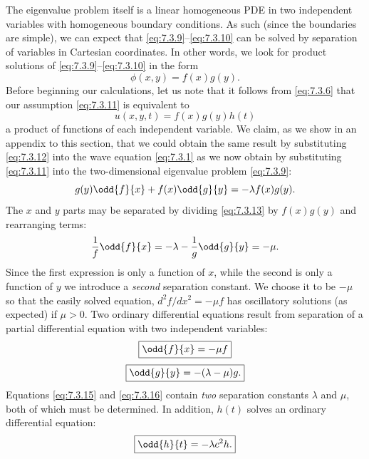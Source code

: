 The eigenvalue problem itself is a linear homogeneous PDE in two independent variables with homogeneous boundary conditions.  As such (since the boundaries are simple), we can expect that \eqref{eq:7.3.9}--\eqref{eq:7.3.10} can be solved by separation of variables in Cartesian coordinates.  In other words, we look for product solutions of \eqref{eq:7.3.9}--\eqref{eq:7.3.10} in the form
\begin{equation}
\phi(x,y) = f(x)g(y).
\label{eq:7.3.11}
\end{equation}
Before beginning our calculations, let us note that it follows from \eqref{eq:7.3.6} that our assumption \eqref{eq:7.3.11} is equivalent to
\begin{equation}
u(x,y,t) = f(x)g(y)h(t)
\label{eq:7.3.12}
\end{equation}
a product of functions of each independent variable.  We claim, as we show in an appendix to this section, that we could obtain the same result by substituting \eqref{eq:7.3.12} into the wave equation \eqref{eq:7.3.1} as we now obtain by substituting \eqref{eq:7.3.11} into the two-dimensional eigenvalue problem \eqref{eq:7.3.9}:
\begin{equation}
g(y)\odd{f}{x} + f(x)\odd{g}{y} = -\lambda f(x)g(y).
\label{eq:7.3.13}
\end{equation}
The $x$ and $y$ parts may be separated by dividing \eqref{eq:7.3.13} by $f(x)g(y)$ and rearranging terms:
\begin{equation}
\frac{1}{f}\odd{f}{x} = -\lambda - \frac{1}{g}\odd{g}{y} = -\mu.
\label{eq:7.3.14}
\end{equation}
Since the first expression is only a function of $x$, while the second is only a function of $y$ we introduce a \emph{second} separation constant.  We choose it to be $-\mu$ so that the easily solved equation, $d^2f/dx^2 = -\mu f$ has oscillatory solutions (as expected) if $\mu > 0$.  Two ordinary differential equations result from separation of a partial differential equation with two independent variables:
\begin{equation}
\boxed{\odd{f}{x} = -\mu f}
\label{eq:7.3.15}
\end{equation}
\begin{equation}
\boxed{\odd{g}{y} = -(\lambda - \mu)g.}
\label{eq:7.3.16}
\end{equation}
Equations \eqref{eq:7.3.15} and \eqref{eq:7.3.16} contain \emph{two} separation constants $\lambda$ and $\mu$, both of which must be determined.  In addition, $h(t)$ solves an ordinary differential equation:
\begin{equation}
\boxed{\odd{h}{t} = -\lambda c^2 h.}
\label{eq:7.3.17}
\end{equation}

